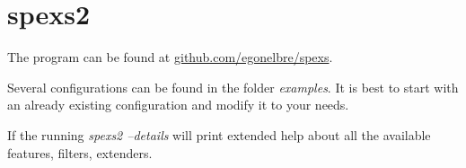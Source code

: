 \chapter{spexs2}
\label{add:spexs2}

The program can be found at \url{github.com/egonelbre/spexs}.

Several configurations can be found in the folder \emph{examples}.
It is best to start with an already existing configuration and 
modify it to your needs.

If the running \emph{spexs2 --details} will print
extended help about all the available features, filters, extenders.

